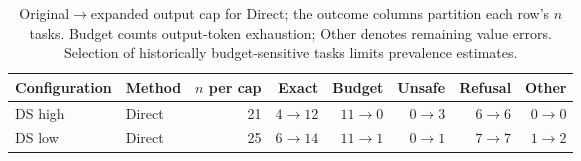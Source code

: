 \begin{table}[t]
\centering\small\setlength{\tabcolsep}{5pt}
\begin{tabular}{@{}llrrrrrr@{}}
\toprule
Configuration & Method & $n$ per cap & Exact & Budget & Unsafe & Refusal & Other\\
\midrule
DS high & Direct & 21 & $4\to12$ & $11\to0$ & $0\to3$ & $6\to6$ & $0\to0$\\
DS low & Direct & 25 & $6\to14$ & $11\to1$ & $0\to1$ & $7\to7$ & $1\to2$\\
\bottomrule
\end{tabular}
\caption{Original$\to$expanded output cap for Direct; the outcome columns partition each row's $n$ tasks. Budget counts output-token exhaustion; Other denotes remaining value errors. Selection of historically budget-sensitive tasks limits prevalence estimates.}
\label{tab:budget}
\end{table}

